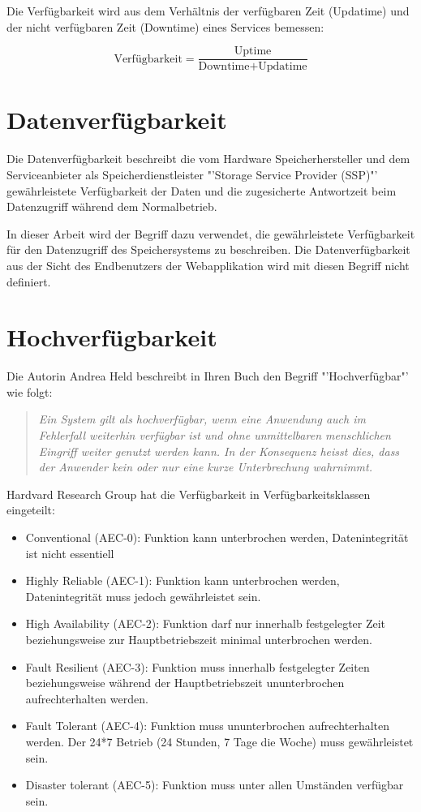 Die Verfügbarkeit wird aus dem Verhältnis der verfügbaren Zeit (Updatime) und der nicht verfügbaren Zeit (Downtime) eines Services \cite{Held2004} bemessen:

\begin{equation}
\mbox{Verfügbarkeit} = \frac{\mbox{Uptime}}{ \mbox{Downtime} + \mbox{Updatime} }
\label{eqn:Verfügbarkeit}
\end{equation}

\section{Datenverfügbarkeit}
Die Datenverfügbarkeit beschreibt die vom Hardware Speicherhersteller und dem Serviceanbieter als Speicherdienstleister "'Storage Service Provider (SSP)"'  gewährleistete Verfügbarkeit der Daten und die zugesicherte Antwortzeit beim Datenzugriff während dem Normalbetrieb. \cite{TechTarget2001}

In dieser Arbeit wird der Begriff dazu verwendet, die gewährleistete Verfügbarkeit für den Datenzugriff des Speichersystems zu beschreiben. Die Datenverfügbarkeit aus der Sicht des Endbenutzers der Webapplikation wird mit diesen Begriff nicht definiert. 

\section{Hochverfügbarkeit}
Die Autorin Andrea Held beschreibt in Ihren Buch den Begriff "'Hochverfügbar"' wie folgt:
\begin{quotation}\em
Ein System gilt als hochverfügbar, wenn eine Anwendung auch im Fehlerfall weiterhin verfügbar ist und ohne unmittelbaren menschlichen Eingriff weiter genutzt werden kann. In der Konsequenz heisst dies, dass der Anwender kein oder nur eine kurze Unterbrechung wahrnimmt.\end{quotation}\cite{Held2004}

Hardvard Research Group hat die Verfügbarkeit in Verfügbarkeitsklassen eingeteilt:

\begin{itemize}
\item Conventional (AEC-0): Funktion kann unterbrochen werden, Datenintegrität ist nicht essentiell
\item Highly Reliable (AEC-1): Funktion kann unterbrochen werden, Datenintegrität muss jedoch gewährleistet sein.
\item High Availability (AEC-2): Funktion darf nur innerhalb festgelegter Zeit beziehungsweise zur Hauptbetriebszeit minimal unterbrochen werden.
\item Fault Resilient (AEC-3): Funktion muss innerhalb festgelegter Zeiten beziehungsweise während der Hauptbetriebszeit ununterbrochen aufrechterhalten werden.
\item Fault Tolerant (AEC-4): Funktion muss ununterbrochen aufrechterhalten werden. Der 24*7 Betrieb (24 Stunden, 7 Tage die Woche) muss gewährleistet sein.
\item Disaster tolerant (AEC-5): Funktion muss unter allen Umständen verfügbar sein.
\end{itemize}
\cite{Held2004}

